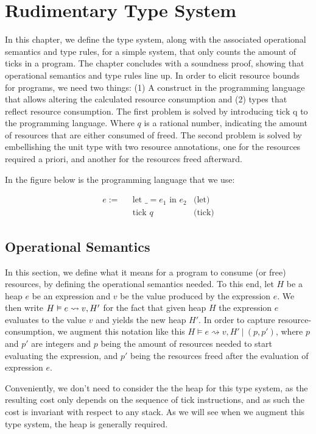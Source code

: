 \chapter{Rudimentary Type System}

In this chapter, we define the type system, along with the associated operational semantics and type rules, for a simple system, that only counts the amount of ticks in a program. The chapter concludes with a soundness proof, showing that operational semantics and type rules line up.
In order to elicit resource bounds for programs, we need two things: (1) A construct in the programming language that allows altering the calculated resource consumption and (2) types that reflect resource consumption. The first problem is solved by introducing \(\text{tick q}\) to the programming language. Where \(q\) is a rational number, indicating the amount of resources that are either consumed of freed. The second problem is solved by embellishing the unit type with two resource annotations, one for the resources required a priori, and another for the resources freed afterward.

In the figure below is the programming language that we use:

\begin{align*}
   e := ~~~ & \text{let } \_ = e_1 \text{ in } e_2   & \text{(let)}\\
            & \text{tick } q                       & \text{(tick)}
\end{align*}


\section{Operational Semantics}
In this section, we define what it means for a program to consume (or free) resources, by defining the operational semantics needed. To this end, let \(H\) be a heap \(e\) be an expression and \(v\) be the value produced by the expression \(e\). We then write \(H \vDash e \rightsquigarrow v, H'\) for the fact that given heap \(H\) the expression \(e\) evaluates to the value \(v\) and yields the new heap \(H'\). In order to capture resource-consumption, we augment this notation like this \(H \vDash e \rightsquigarrow v, H'~| ~(p, p')\), where \(p\) and \(p'\) are integers and \(p\) being the amount of resources needed to start evaluating the expression, and \(p'\) being the resources freed after the evaluation of expression \(e\).

Conveniently, we don't need to consider the the heap for this type system, as the resulting cost only depends on the sequence of tick instructions, and as such the cost is invariant with respect to any stack. As we will see when we augment this type system, the heap is generally required.

